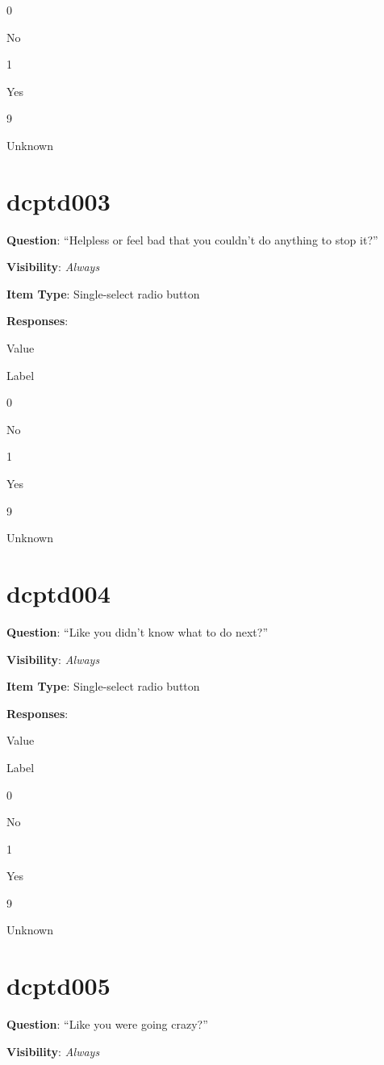 \documentclass[]{book}
\begin{document}
0

No

1

Yes

9

Unknown

\hypertarget{dcptd003}{%
\section{dcptd003}\label{dcptd003}}

\textbf{Question}: ``Helpless or feel bad that you couldn't do anything to stop it?''

\textbf{Visibility}: \emph{Always}

\textbf{Item Type}: Single-select radio button

\textbf{Responses}:

Value

Label

0

No

1

Yes

9

Unknown

\hypertarget{dcptd004}{%
\section{dcptd004}\label{dcptd004}}

\textbf{Question}: ``Like you didn't know what to do next?''

\textbf{Visibility}: \emph{Always}

\textbf{Item Type}: Single-select radio button

\textbf{Responses}:

Value

Label

0

No

1

Yes

9

Unknown

\hypertarget{dcptd005}{%
\section{dcptd005}\label{dcptd005}}

\textbf{Question}: ``Like you were going crazy?''

\textbf{Visibility}: \emph{Always}
\end{document}
